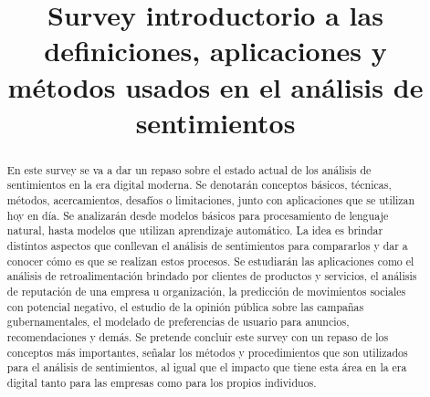 \documentclass[12pt, conference]{IEEEtran}
\begin{document}
\title{Survey introductorio a las definiciones, aplicaciones y métodos usados en el análisis de sentimientos\\
}

\author{
\and
{}
\and
{}
}

\maketitle

\begin{abstract}
  En este survey se va a dar un repaso sobre el estado actual de los análisis de sentimientos en la era digital moderna. 
  Se denotarán conceptos básicos, técnicas, métodos, acercamientos, desafíos o limitaciones, junto con aplicaciones que se utilizan hoy en día. 
  Se analizarán desde modelos básicos para procesamiento de lenguaje natural, hasta modelos que utilizan aprendizaje automático. 
  La idea es brindar distintos aspectos que conllevan el análisis de sentimientos para compararlos y dar a conocer cómo es que se realizan estos procesos. 
  Se estudiarán las aplicaciones como el análisis de retroalimentación brindado por clientes de productos y servicios, el análisis de reputación de una empresa u organización, la predicción de movimientos sociales con potencial negativo, el estudio de la opinión pública sobre las campañas gubernamentales, el modelado de preferencias de usuario para anuncios, recomendaciones y demás. 
  Se pretende concluir este survey con un repaso de los conceptos más importantes, señalar los métodos y procedimientos que son utilizados para el análisis de sentimientos, al igual que el impacto que tiene esta área en la era digital tanto para las empresas como para los propios individuos.
\end{abstract}
\end{document}
